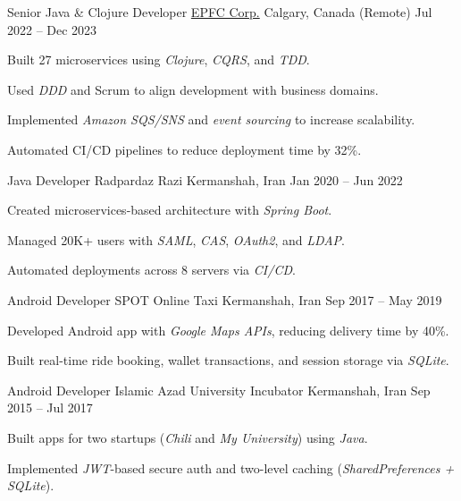 \begin{cventries}
  \cventry
    {Senior Java \& Clojure Developer} %
    {\href{https://www.epfccorp.com/}{EPFC Corp.}}  %
    {Calgary, Canada (Remote)} %
    {Jul 2022 -- Dec 2023} %
    {
      \begin{cvitems}
        \item Built 27 microservices using \textit{Clojure}, \textit{CQRS}, and \textit{TDD}.
        \item Used \textit{DDD} and Scrum to align development with business domains.
        \item Implemented \textit{Amazon SQS/SNS} and \textit{event sourcing} to increase scalability.
        \item Automated CI/CD pipelines to reduce deployment time by 32\%.
      \end{cvitems}
    }

  \cventry
    {Java Developer} %
    {Radpardaz Razi} %
    {Kermanshah, Iran} %
    {Jan 2020 -- Jun 2022} %
    {
      \begin{cvitems}
        \item Created microservices-based architecture with \textit{Spring Boot}.
        \item Managed 20K+ users with \textit{SAML}, \textit{CAS}, \textit{OAuth2}, and \textit{LDAP}.
        \item Automated deployments across 8 servers via \textit{CI/CD}.
      \end{cvitems}
    }

  \cventry
    {Android Developer} %
    {SPOT Online Taxi} %
    {Kermanshah, Iran} %
    {Sep 2017 -- May 2019} %
    {
      \begin{cvitems}
        \item Developed Android app with \textit{Google Maps APIs}, reducing delivery time by 40\%.
        \item Built real-time ride booking, wallet transactions, and session storage via \textit{SQLite}.
      \end{cvitems}
    }

  \cventry
    {Android Developer} %
    {Islamic Azad University Incubator} %
    {Kermanshah, Iran} %
    {Sep 2015 -- Jul 2017} %
    {
      \begin{cvitems}
        \item Built apps for two startups (\textit{Chili} and \textit{My University}) using \textit{Java}.
        \item Implemented \textit{JWT}-based secure auth and two-level caching (\textit{SharedPreferences + SQLite}).
      \end{cvitems}
    }

\end{cventries}
